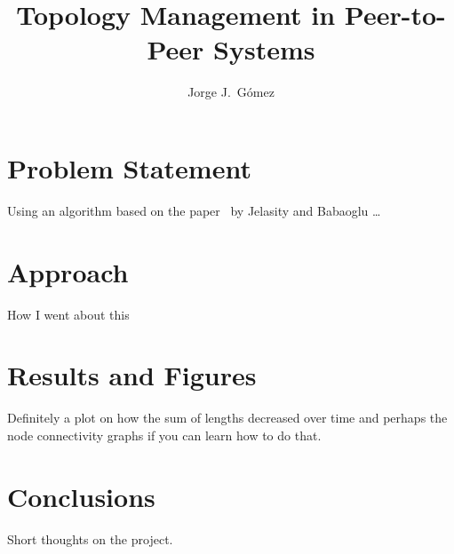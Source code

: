 \documentclass{article}
\begin{document}
\title{Topology Management in Peer-to-Peer Systems}
\author{Jorge J.~G\'omez}

\maketitle
\section{Problem Statement}
  Using an algorithm based on the paper~\cite{t-man} by Jelasity and Babaoglu
  \ldots
\section{Approach}
  How I went about this
\section{Results and Figures}
  Definitely a plot on how the sum of lengths decreased over time and perhaps
  the node connectivity graphs if you can learn how to do that.
\section{Conclusions}
  Short thoughts on the project.



\end{document}
